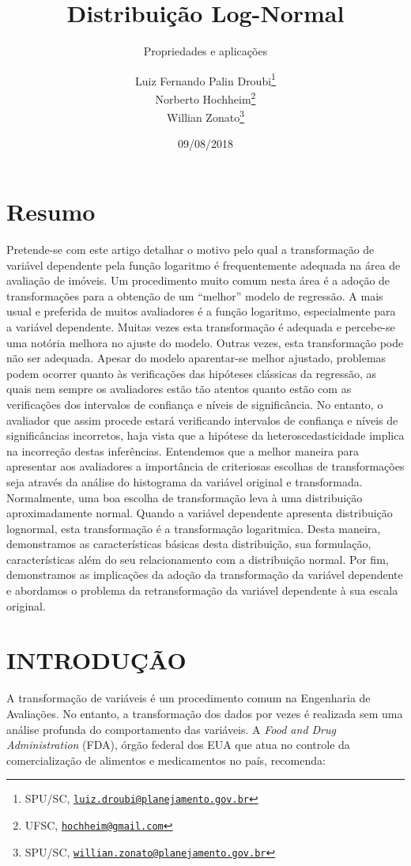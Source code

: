 \documentclass[a4paper]{article}
\title{Distribuição Log-Normal}
\subtitle{Propriedades e aplicações}
\author{Luiz Fernando Palin Droubi\footnote{SPU/SC,
  \href{mailto:luiz.droubi@planejamento.gov.br}{\nolinkurl{luiz.droubi@planejamento.gov.br}}} \\ Norberto Hochheim\footnote{UFSC,
  \href{mailto:hochheim@gmail.com}{\nolinkurl{hochheim@gmail.com}}} \\ Willian Zonato\footnote{SPU/SC,
  \href{mailto:willian.zonato@planejamento.gov.br}{\nolinkurl{willian.zonato@planejamento.gov.br}}}}
\date{09/08/2018}
\begin{document}
\maketitle

\section*{Resumo}\label{resumo}

Pretende-se com este artigo detalhar o motivo pelo qual a transformação
de variável dependente pela função logaritmo é frequentemente adequada
na área de avaliação de imóveis. Um procedimento muito comum nesta área
é a adoção de transformações para a obtenção de um ``melhor'' modelo de
regressão. A mais usual e preferida de muitos avaliadores é a função
logaritmo, especialmente para a variável dependente. Muitas vezes esta
transformação é adequada e percebe-se uma notória melhora no ajuste do
modelo. Outras vezes, esta transformação pode não ser adequada. Apesar
do modelo aparentar-se melhor ajustado, problemas podem ocorrer quanto
às verificações das hipóteses clássicas da regressão, as quais nem
sempre os avaliadores estão tão atentos quanto estão com as verificações
dos intervalos de confiança e níveis de significância. No entanto, o
avaliador que assim procede estará verificando intervalos de confiança e
níveis de significâncias incorretos, haja vista que a hipótese da
heteroscedasticidade implica na incorreção destas inferências.
Entendemos que a melhor maneira para apresentar aos avaliadores a
importância de criteriosas escolhas de transformações seja através da
análise do histograma da variável original e transformada. Normalmente,
uma boa escolha de transformação leva à uma distribuição aproximadamente
normal. Quando a variável dependente apresenta distribuição lognormal,
esta transformação é a transformação logaritmica. Desta maneira,
demonstramos as características básicas desta distribuição, sua
formulação, características além do seu relacionamento com a
distribuição normal. Por fim, demonstramos as implicações da adoção da
transformação da variável dependente e abordamos o problema da
retransformação da variável dependente à sua escala original.

\section{INTRODUÇÃO}\label{introducao}

A transformação de variáveis é um procedimento comum na Engenharia de
Avaliações. No entanto, a transformação dos dados por vezes é realizada
sem uma análise profunda do comportamento das variáveis. A \emph{Food
and Drug Administration} (FDA), órgão federal dos EUA que atua no
controle da comercialização de alimentos e medicamentos no país,
recomenda:
\end{document}
